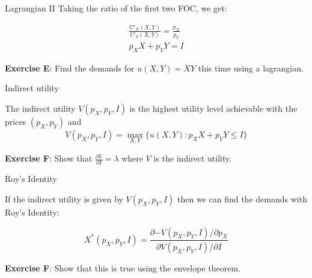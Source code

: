 \documentclass[handout]{beamer}
\begin{document}
\begin{frame}{Lagrangian II}
Taking the ratio of the first two FOC, we get:

\begin{align*}
\frac{U'_X(X,Y)}{U'_Y(X,Y)} = \frac{p_X}{p_Y} \\
p_X X + p_Y Y = I
\end{align*}

\textbf{Exercise E}: Find the demands for $u(X,Y) = XY$ this time using a lagrangian. 
\newline

\end{frame}

\begin{frame}{Indirect utility}

The indirect utility $V(p_X,p_Y,I)$ is the highest utility level achievable with the prices $(p_X,p_Y)$ and 
$$ V(p_X,p_Y,I) = \max_{X,Y} \{ u(X,Y) : p_X X + p_Y Y \le I\} $$

\textbf{Exercise F}: Show that $\frac{\partial V}{\partial I} = \lambda$ where $V$ is the indirect utility. 
\end{frame}

\begin{frame}{Roy's Identity}

If the indirect utility is given by $V(p_X,p_Y,I)$ then we can find the demands with Roy's Identity: 

$$ X^*(p_X,p_Y,I) = \frac{\partial{-V(p_X,p_Y,I)}/\partial{p_X}}{\partial{V(p_X,p_Y,I)}/\partial{I}}  $$

\textbf{Exercise F}: Show that this is true using the envelope theorem. 
\end{frame}
\end{document}
